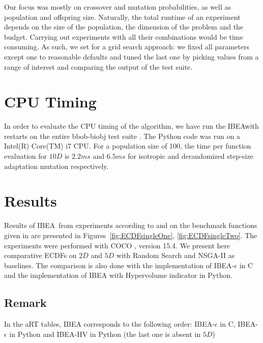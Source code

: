 \documentclass{sig-alternate}
\newcommand{\algname}{IBEA}
\begin{document}
Our focus was mostly on crossover and mutation probabilities, as well as population and offspring size. Naturally, the total runtime of an experiment depends on the size of the population, the dimension of the problem and the budget. Carrying out experiments with all their combinations would be time consuming. As such, we set for a grid search approach: we fixed all parameters except one to reasonable defaults and tuned the last one by picking values from a range of interest and comparing the output of the test suite.

\section{CPU Timing}
In order to evaluate the CPU timing of the algorithm, we have run the \algname with restarts on the entire bbob-biobj test suite \cite{biobj2016func}. The Python code was run on a Intel(R) Core(TM) i7 CPU. For a population size of 100, the time per function evaluation for $10D$ is $2.2ms$ and $6.5ms$ for isotropic and derandomized step-size adaptation mutation respectively.  


\section{Results}

Results of \algname\ from experiments according to \cite{hansen2016exp} and \cite{brockhoff2016biobjective} on the benchmark
functions given in \cite{biobj2016func} are presented in
Figures~\ref{fig:ECDFsingleOne}, \ref{fig:ECDFsingleTwo}. The experiments were performed with COCO \cite{hansen2016cocoplat}, version 15.4.
We present here comparative ECDFs on $2D$ and $5D$ with Random Search and NSGA-II \cite{deb2002fast} as baselines. The comparison is also done with the implementation of IBEA-$\epsilon$ in C and the implementation of IBEA with Hypervolume indicator in Python.

\subsection*{Remark}
In the aRT tables, IBEA corresponds to the following order: IBEA-$\epsilon$ in C, IBEA-$\epsilon$ in Python and IBEA-HV in Python (the last one is absent in $5D$)
\end{document}
